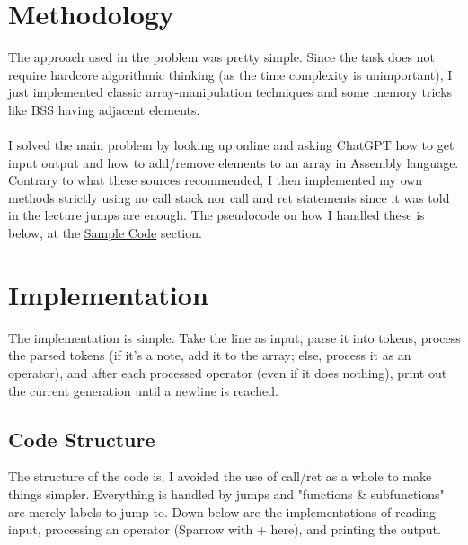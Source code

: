\documentclass[a4paper,12pt]{article}
\begin{document}
\section{Methodology}
The approach used in the problem was pretty simple. Since the task does not require hardcore algorithmic thinking (as the time complexity is unimportant), I just implemented classic array-manipulation techniques and some memory tricks like BSS having adjacent elements.\\\\ I solved the main problem by looking up online and asking ChatGPT how to get input output and how to add/remove elements to an array in Assembly language. Contrary to what these sources recommended, I then implemented my own methods strictly using no call stack nor call and ret statements since it was told in the lecture jumps are enough. The pseudocode on how I handled these is below, at the \hyperref[sec:samplecode]{Sample Code} section.

\section{Implementation}
The implementation is simple. Take the line as input, parse it into tokens, process the parsed tokens (if it's a note, add it to the array; else, process it as an operator), and after each processed operator (even if it does nothing), print out the current generation until a newline is reached.

\subsection{Code Structure}
The structure of the code is, I avoided the use of call/ret as a whole to make things simpler. Everything is handled by jumps and "functions \& subfunctions" are merely labels to jump to. Down below are the implementations of reading input, processing an operator (Sparrow with + here), and printing the output.
\end{document}
